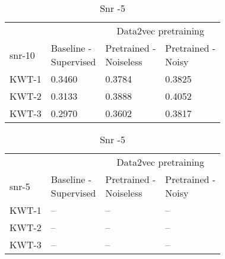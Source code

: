 \begin{table}[ht]
    \centering
    \begin{subtable}[ht]{0.45\textwidth}
        \centering
        \begin{tabular}{@{}llll@{}}
        \toprule
        & & \multicolumn{2}{c}{Data2vec pretraining} \\ \cline{3-4}
        snr-10    & \makecell{ Baseline - \\ Supervised } & \makecell{ Pretrained - \\ Noiseless } & \makecell{ Pretrained - \\ Noisy } \\ \midrule
        KWT-1    & 0.3460  & 0.3784 & 0.3825 \\
        KWT-2    & 0.3133  & 0.3888 & 0.4052 \\
        KWT-3    & 0.2970  & 0.3602 & 0.3817 \\
        \bottomrule
        \end{tabular}
        \caption{Snr -10}
    \end{subtable}
    \hfill
    \begin{subtable}[ht]{0.45\textwidth}
        \centering
        \begin{tabular}{@{}llll@{}}
        \toprule
        & & \multicolumn{2}{c}{Data2vec pretraining} \\ \cline{3-4}
        snr-5    & \makecell{ Baseline - \\ Supervised } & \makecell{ Pretrained - \\ Noiseless } & \makecell{ Pretrained - \\ Noisy } \\ \midrule
        KWT-1    & --  & -- & -- \\
        KWT-2    & --  & -- & -- \\
        KWT-3    & --  & -- & -- \\
        \bottomrule
        \end{tabular}
        \caption{Snr -5}
    \end{subtable}
     
     
    \bigskip



\end{table}
